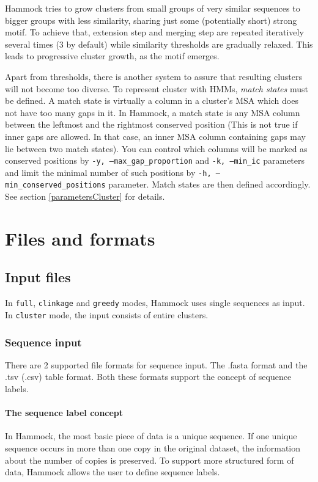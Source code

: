 \documentclass[11pt, a4paper, twoside, titlepage]{article}
\begin{document}
Hammock tries to grow clusters from small groups of very similar sequences to bigger groups with less similarity, sharing just some (potentially short) strong motif. To achieve that, extension step and merging step are repeated iteratively several times (3 by default) while similarity thresholds are gradually relaxed. This leads to progressive cluster growth, as the motif emerges.

Apart from thresholds, there is another system to assure that resulting clusters will not become too diverse. To represent cluster with HMMs, \textit{match states} must be defined. A match state is virtually a column in a cluster's MSA which does not have too many gaps in it. In Hammock, a match state is any MSA column between the leftmost and the rightmost conserved position (This is not true if inner gaps are allowed. In that case, an inner MSA column containing gaps may lie between two match states).  You can control which columns will be marked as conserved positions by \texttt{-y, --max\_gap\_proportion} and \texttt{-k, --min\_ic} parameters and limit the minimal number of such positions by \texttt{-h, --min\_conserved\_positions} parameter. Match states are then defined accordingly. See section \ref{parametersCluster} for details. 




\section{Files and formats}
\label{filesandformats}
\subsection{Input files}
\label{inputfiles}
In \texttt{full}, \texttt{clinkage} and \texttt{greedy} modes, Hammock uses single sequences as input. In \texttt{cluster} mode, the input consists of entire clusters.

\subsubsection{Sequence input}
There are 2 supported file formats for sequence input. The .fasta format and the .tsv (.csv) table format. Both these formats support the concept of sequence labels. 

\paragraph{The sequence label concept} \label{labelConcept} In Hammock, the most basic piece of data is a unique sequence. If one unique sequence occurs in more than one copy in the original dataset, the information about the number of copies is preserved. To support more structured form of data, Hammock allows the user to define sequence labels. 
\end{document}
